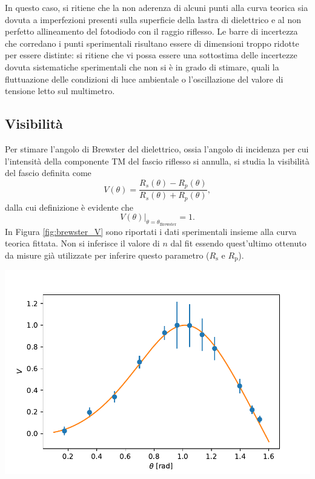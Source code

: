 \documentclass[10pt,oneside,a4paper]{article}
\newenvironment{Figure}
  {\par\medskip\noindent\minipage{\linewidth}}
  {\endminipage\par\medskip}
\begin{document}
\begin{multicols}{2}
In questo caso, si ritiene che la non aderenza di alcuni punti alla curva teorica sia dovuta a imperfezioni presenti sulla superficie della lastra di dielettrico e al non perfetto allineamento del fotodiodo con il raggio riflesso. Le barre di incertezza che corredano i punti sperimentali risultano essere di dimensioni troppo ridotte per essere distinte: si ritiene che vi possa essere una sottostima delle incertezze dovuta sistematiche sperimentali che non si è in grado di stimare, quali la fluttuazione delle condizioni di luce ambientale o l'oscillazione del valore di tensione letto sul multimetro.

\subsection{Visibilità}
Per stimare l'angolo di Brewster del dielettrico, ossia l'angolo di incidenza per cui l'intensità della componente TM del fascio riflesso si annulla, si studia la visibilità del fascio definita come
\begin{equation}\label{eq:visibilità}
	V(\theta) = \frac{R_s(\theta) - R_p(\theta)}{R_s(\theta) + R_p(\theta)},
\end{equation}
dalla cui definizione è evidente che
\begin{equation}
	\left. V(\theta) \right\vert_{\theta = \theta_\mathrm{Brewster}} = 1.
\end{equation}
In Figura \ref{fig:brewster_V} sono riportati i dati sperimentali insieme alla curva teorica fittata. Non si inferisce il valore di $n$ dal fit essendo quest'ultimo ottenuto da misure già utilizzate per inferire questo parametro ($R_\mathrm{s}$ e $R_\mathrm{p}$).
\begin{Figure}
	\begin{center}
	\includegraphics[width=\linewidth]{visibilità.pdf}

\end{center}
\end{Figure}
\end{multicols}
\end{document}
